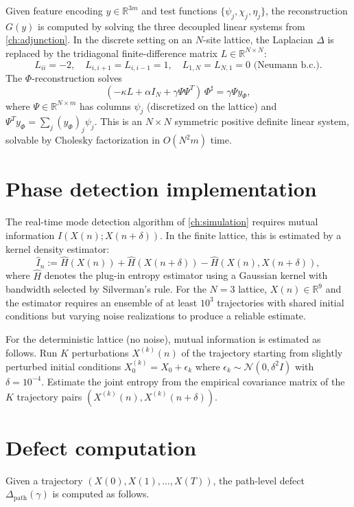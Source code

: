 \documentclass[12pt, oneside]{memoir}
\newcommand{\Dpth}{\Delta_{\mathrm{path}}}
\begin{document}
Given feature encoding $y \in \mathbb{R}^{3m}$ and test functions $\{\psi_j, \chi_j,
\eta_j\}$, the reconstruction $G(y)$ is computed by solving the three decoupled linear
systems from \cref{ch:adjunction}.  In the discrete setting on an $N$-site lattice, the
Laplacian $\Delta$ is replaced by the tridiagonal finite-difference matrix $L \in
\mathbb{R}^{N \times N}$:
\[
  L_{ii} = -2, \quad L_{i,i+1} = L_{i,i-1} = 1, \quad L_{1,N} = L_{N,1} = 0
  \text{ (Neumann b.c.)}.
\]
The $\Phi$-reconstruction solves
\[
  (-\kappa L + \alpha I_N + \gamma \Psi \Psi^T)\, \Phi^\sharp = \gamma \Psi y_\Phi,
\]
where $\Psi \in \mathbb{R}^{N \times m}$ has columns $\psi_j$ (discretized on the lattice)
and $\Psi^T y_\Phi = \sum_j (y_\Phi)_j \psi_j$.  This is an $N \times N$ symmetric
positive definite linear system, solvable by Cholesky factorization in $O(N^2 m)$ time.

\section{Phase detection implementation}

The real-time mode detection algorithm of \cref{ch:simulation} requires mutual
information $I(X(n); X(n+\delta))$.  In the finite lattice, this is estimated by a
kernel density estimator:
\begin{equation}
  \hat I_n := \hat H(X(n)) + \hat H(X(n+\delta)) - \hat H(X(n), X(n+\delta)),
\end{equation}
where $\hat H$ denotes the plug-in entropy estimator using a Gaussian kernel with
bandwidth selected by Silverman's rule.  For the $N=3$ lattice, $X(n) \in \mathbb{R}^9$
and the estimator requires an ensemble of at least $10^3$ trajectories with shared
initial conditions but varying noise realizations to produce a reliable estimate.

For the deterministic lattice (no noise), mutual information is estimated as follows.
Run $K$ perturbations $X^{(k)}(n)$ of the trajectory starting from slightly perturbed
initial conditions $X^{(k)}_0 = X_0 + \epsilon_k$ where $\epsilon_k \sim \mathcal{N}(0,
\delta^2 I)$ with $\delta = 10^{-4}$.  Estimate the joint entropy from the empirical
covariance matrix of the $K$ trajectory pairs $(X^{(k)}(n), X^{(k)}(n+\delta))$.

\section{Defect computation}

Given a trajectory $(X(0), X(1), \dots, X(T))$, the path-level defect $\Dpth(\gamma)$
is computed as follows.
\end{document}
